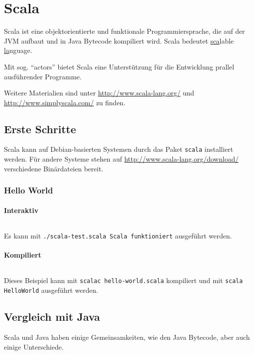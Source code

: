 \chapter{Scala}

Scala ist eine objektorientierte und funktionale Programmiersprache, die auf der JVM aufbaut und in Java Bytecode kompiliert wird. Scala bedeutet \underline{sca}lable
\underline{la}nguage.

Mit sog. \enquote{actors} bietet Scala eine Unterstützung für die Entwicklung
prallel ausführender Programme.

Weitere Materialien sind unter \url{http://www.scala-lang.org/} und
\url{http://www.simplyscala.com/} zu finden.

\section{Erste Schritte}
Scala kann auf Debian-basierten Systemen durch das Paket \texttt{scala} installiert
werden. Für andere Systeme stehen auf \url{http://www.scala-lang.org/download/}
verschiedene Binärdateien bereit.

\subsection{Hello World}
\subsubsection{Interaktiv}
\inputminted[numbersep=5pt, tabsize=4]{bash}{scripts/scala/scala-test.scala}
Es kann mit \texttt{./scala-test.scala Scala funktioniert} ausgeführt werden.

\subsubsection{Kompiliert}
\inputminted[linenos, numbersep=5pt, tabsize=4, frame=lines, label=hello-world.scala]{scala}{scripts/scala/hello-world.scala}

Dieses Beispiel kann mit \texttt{scalac hello-world.scala} kompiliert und mit
\texttt{scala HelloWorld} ausgeführt werden.

\section{Vergleich mit Java}
Scala und Java haben einige Gemeinsamkeiten, wie den Java Bytecode, aber auch
einige Unterschiede.

